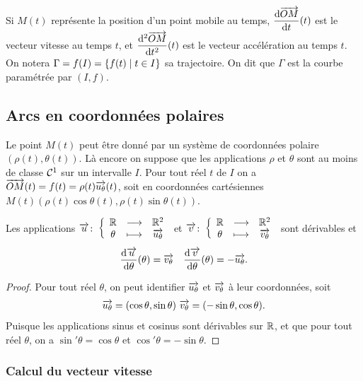 Si \(M(t)\) représente la position d'un point mobile au temps, 
\(\dfrac{\mathrm{d} \overrightarrow{OM}}{\mathrm{d} t}(t)\) est le vecteur vitesse au temps \(t\), et 
\(\dfrac{\mathrm{d}^2 \overrightarrow{OM}}{\mathrm{d} {t}^2}(t)\) est le vecteur accélération au temps \(t\). On 
notera \(\Gamma = f(I) =\left\{f(t)\mathrel{}\middle|\mathrel{}t \in I\right\}\) sa trajectoire. On dit que 
\(\Gamma\) est la courbe paramétrée par \((I, f)\).

\subsection{Arcs en coordonnées polaires}

Le point \(M(t)\) peut être donné par un système de coordonnées polaire 
\((\rho(t), \theta(t))\). Là encore on suppose que les applications \(\rho\) et 
\(\theta\) sont au moins de classe \(\mathcal{C}^{1}\) sur un intervalle \(I\). Pour 
tout réel \(t\) de \(I\) on a \(\overrightarrow{OM}(t) = f(t) = 
\rho(t)\overrightarrow{u_\theta}(t)\), soit en coordonnées cartésiennes 
\(M(t)(\rho(t)\cos\theta(t), \rho(t)\sin\theta(t))\).

\begin{prop}
  Les applications \(\overrightarrow{u}\colon \left\{\begin{array}{ccc} \mathbb{R} & \longrightarrow &\mathbb{R}^2\\ \theta & \longmapsto & \overrightarrow{u_\theta} \end{array} \right.\) et 
  \(\overrightarrow{v}\colon \left\{\begin{array}{ccc} \mathbb{R} & \longrightarrow &\mathbb{R}^2\\ \theta & \longmapsto & \overrightarrow{v_\theta} \end{array} \right.\) sont dérivables et
  \begin{equation}
    \dfrac{\mathrm{d} \overrightarrow{u}}{\mathrm{d} \theta}(\theta) = \overrightarrow{v_\theta} \quad 
    \dfrac{\mathrm{d} \overrightarrow{v}}{\mathrm{d} \theta}(\theta) = -\overrightarrow{u_\theta}.
  \end{equation}
\end{prop}

\begin{proof}
  Pour tout réel \(\theta\), on peut identifier \(\overrightarrow{u_\theta}\) et 
  \(\overrightarrow{v_\theta}\) à leur coordonnées, soit
  \begin{equation}
    \overrightarrow{u_\theta} = (\cos \theta, \sin \theta) \ \overrightarrow{v_{\theta}} = (-\sin 
    \theta, \cos \theta).
  \end{equation}
  Puisque les applications sinus et cosinus sont dérivables sur \(\mathbb{R}\), et que 
  pour tout réel \(\theta\), on a \(\sin' \theta = \cos \theta\) et \(\cos' 
  \theta = -\sin \theta\).
\end{proof}

\subsubsection{Calcul du vecteur vitesse}

